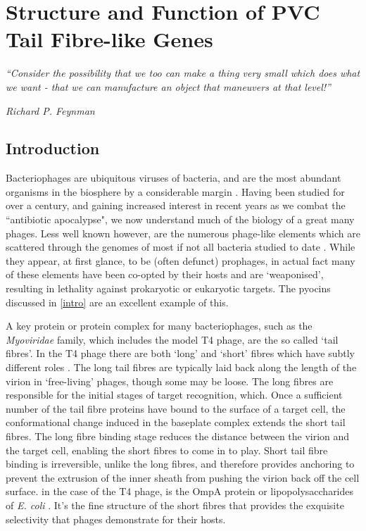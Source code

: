 \pagestyle{IHA-fancy-style}

\chapter{Structure and Function of PVC Tail Fibre-like Genes}\label{tailfibres}

\epigraph{\emph{``Consider the possibility that we too can make a thing very small which does what we want - that we can manufacture an object that maneuvers at that level!''}}{\textit{Richard P. Feynman}}


\section{Introduction}\label{tailfibreintro}
Bacteriophages are ubiquitous viruses of bacteria, and are the most abundant organisms in the biosphere by a considerable margin \citep{Clokie2011, Bartual2010}. Having been studied for over a century, and gaining increased interest in recent years as we combat the ``antibiotic apocalypse", we now understand much of the biology of a great many phages. Less well known however, are the numerous phage-like elements which are scattered through the genomes of most if not all bacteria studied to date \citep{Sarris2014}. While they appear, at first glance, to be (often defunct) prophages, in actual fact many of these elements have been co-opted by their hosts and are `weaponised', resulting in lethality against prokaryotic or eukaryotic targets. The pyocins discussed in \ref{intro} are an excellent example of this.

A key protein or protein complex for many bacteriophages, such as the \emph{Myoviridae} family, which includes the model T4 phage, are the so called `tail fibres'. In the T4 phage there are both `long' and `short' fibres which have subtly different roles \citep{Leiman2010}. The long tail fibres are typically laid back along the length of the virion in `free-living' phages, though some may be loose. The long fibres are responsible for the initial stages of target recognition, which. Once a sufficient number of the tail fibre proteins have bound to the surface of a target cell, the conformational change induced in the baseplate complex extends the short tail fibres. The long fibre binding stage reduces the distance between the virion and the target cell, enabling the short fibres to come in to play. Short tail fibre binding is irreversible, unlike the long fibres, and therefore provides anchoring to prevent the extrusion of the inner sheath from pushing the virion back off the cell surface.  in the case of the T4 phage, is the OmpA protein or lipopolysaccharides of \emph{E. coli} \citep{Granell2014, Taylor2016, Riede1987}. It's the fine structure of the short fibres that provides the exquisite selectivity that phages demonstrate for their hosts.

